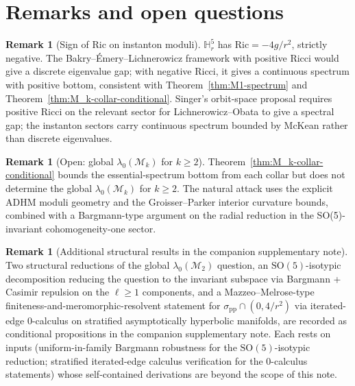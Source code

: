 \documentclass[11pt,letterpaper]{article}
\theoremstyle{definition}
\newtheorem{remark}[theorem]{Remark}
\newcommand{\bbH}{\mathbb{H}}
\newcommand{\cM}{\mathcal{M}}
\begin{document}
\section{Remarks and open questions}

\begin{remark}[Sign of $\mathrm{Ric}$ on instanton moduli]
$\bbH^5_r$ has $\mathrm{Ric} = -4g/r^2$, strictly negative. The Bakry--\'Emery--Lichnerowicz framework with positive Ricci would give a discrete eigenvalue gap; with negative Ricci, it gives a continuous spectrum with positive bottom, consistent with Theorem~\ref{thm:M1-spectrum} and Theorem~\ref{thm:M_k-collar-conditional}. Singer's orbit-space proposal \cite{Singer1981} requires positive Ricci on the relevant sector for Lichnerowicz--Obata to give a spectral gap; the instanton sectors carry continuous spectrum bounded by McKean rather than discrete eigenvalues.
\end{remark}

\begin{remark}[Open: global $\lambda_0(\cM_k)$ for $k \ge 2$]
Theorem~\ref{thm:M_k-collar-conditional} bounds the essential-spectrum bottom from each collar but does not determine the global $\lambda_0(\cM_k)$ for $k \ge 2$. The natural attack uses the explicit ADHM moduli geometry and the Groisser--Parker interior curvature bounds, combined with a Bargmann-type argument on the radial reduction in the SO(5)-invariant cohomogeneity-one sector.
\end{remark}

\begin{remark}[Additional structural results in the companion supplementary note]\label{rmk:companion}
Two structural reductions of the global $\lambda_0(\cM_2)$ question, an $\mathrm{SO}(5)$-isotypic decomposition reducing the question to the invariant subspace via Bargmann + Casimir repulsion on the $\ell \ge 1$ components, and a Mazzeo--Melrose-type finiteness-and-meromorphic-resolvent statement for $\sigma_{\mathrm{pp}} \cap (0, 4/r^2)$ via iterated-edge $0$-calculus on stratified asymptotically hyperbolic manifolds, are recorded as conditional propositions in the companion supplementary note. Each rests on inputs (uniform-in-family Bargmann robustness for the $\mathrm{SO}(5)$-isotypic reduction; stratified iterated-edge calculus verification for the $0$-calculus statements) whose self-contained derivations are beyond the scope of this note.
\end{remark}

\appendix
\end{document}
